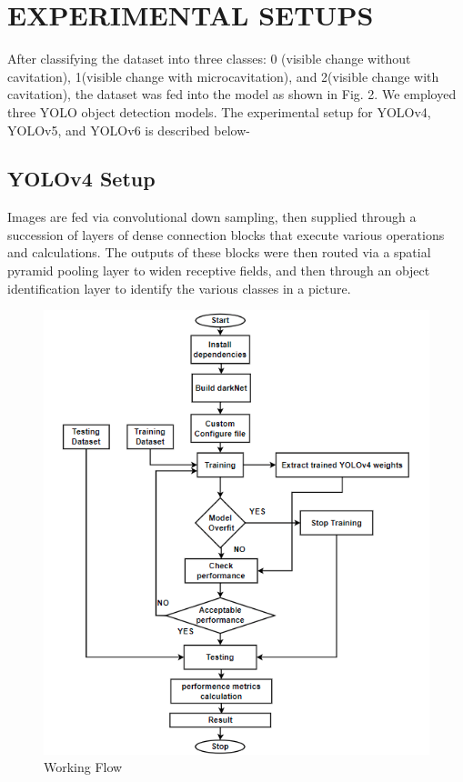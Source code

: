 \chapter{EXPERIMENTAL SETUPS}
After classifying the dataset into three classes: 0 (visible change without cavitation), 1(visible change with microcavitation), and 2(visible change with cavitation), the dataset was fed into the model as shown in Fig. 2. We employed three YOLO object detection models. The experimental setup for YOLOv4, YOLOv5, and YOLOv6 is described below-\\
\section{YOLOv4 Setup} Images are fed via convolutional down sampling, then supplied through a succession of layers of dense connection blocks that execute various operations and calculations.  The outputs of these blocks were then routed via a spatial pyramid pooling layer to widen receptive fields, and then through an object identification layer to identify the various classes in a picture.
\begin{figure}[H]
    \centering
    \includegraphics[scale=0.7]{50_Chapter_5/3.png}
    \caption{Working Flow}
    \label{Working Flow}
\end{figure}
